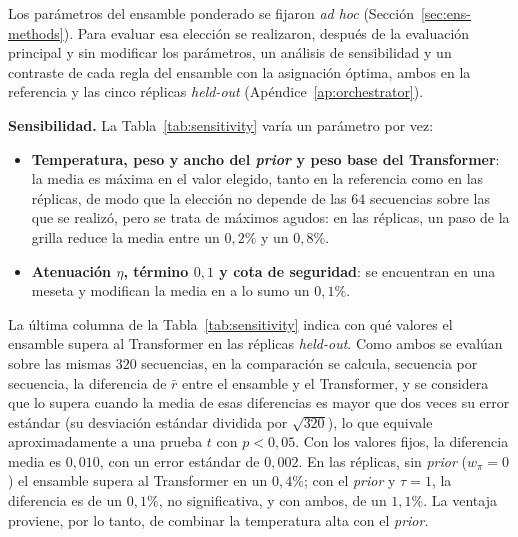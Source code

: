 \documentclass[../00_Main/Main.tex]{subfiles}
\begin{document}
Los par\'ametros del ensamble ponderado se fijaron \emph{ad hoc}
(Secci\'on~\ref{sec:ens-methods}). Para evaluar esa elecci\'on se
realizaron, despu\'es de la evaluaci\'on principal y sin modificar los
par\'ametros, un an\'alisis de sensibilidad y un contraste de cada regla del ensamble
con la asignaci\'on \'optima, ambos en la referencia y las cinco r\'eplicas
\emph{held-out} (Ap\'endice~\ref{ap:orchestrator}).

\textbf{Sensibilidad.} La Tabla~\ref{tab:sensitivity} var\'ia un
par\'ametro por vez:

\begin{itemize}
    \item \textbf{Temperatura, peso y ancho del \emph{prior} y peso base del
    Transformer}: la media es m\'axima en el valor elegido, tanto en la
    referencia como en las r\'eplicas, de modo que la elecci\'on no depende
    de las $64$ secuencias sobre las que se realiz\'o, pero se trata de
    m\'aximos agudos: en las r\'eplicas, un paso de la grilla reduce la
    media entre un $0{,}2\%$ y un $0{,}8\%$.
    \item \textbf{Atenuaci\'on $\eta$, t\'ermino $0{,}1$ y cota de
    seguridad}: se encuentran en una meseta y modifican la media en a lo
    sumo un $0{,}1\%$.
\end{itemize}

La \'ultima columna de la Tabla~\ref{tab:sensitivity} indica con qu\'e
valores el ensamble supera al Transformer en las r\'eplicas
\emph{held-out}. Como ambos se eval\'uan sobre las mismas $320$
secuencias, en la comparaci\'on se calcula, secuencia por
secuencia, la diferencia de $\bar r$ entre el ensamble y el Transformer,
y se considera que lo supera cuando la media de esas diferencias es mayor
que dos veces su error est\'andar (su desviaci\'on est\'andar dividida por
$\sqrt{320}$), lo que equivale aproximadamente a una prueba $t$
con $p < 0{,}05$. Con los valores fijos, la diferencia media es
$0{,}010$, con un error est\'andar de $0{,}002$. En las r\'eplicas, sin \emph{prior}
($w_\pi = 0$) el ensamble supera al Transformer en un $0{,}4\%$; con el
\emph{prior} y $\tau = 1$, la diferencia es de un $0{,}1\%$, no
significativa, y con ambos, de un $1{,}1\%$.
La ventaja proviene, por lo tanto, de combinar la temperatura alta con
el \emph{prior}.
\end{document}
